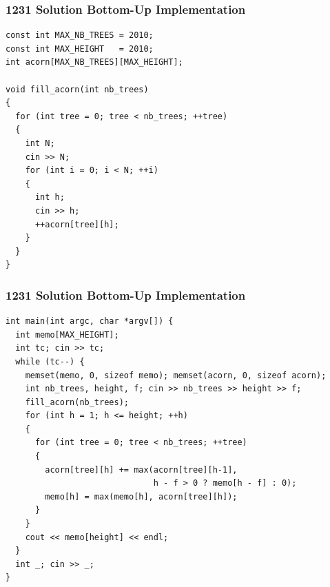 \documentclass{beamer}
\newcommand{\uvalink}[2]{UVa Online Judge (http://uva.onlinejudge.org)
  problem number \href{#2}{\textcolor{blue}{#1}.}}
\newcounter{exo}
\newcommand{\exo}{
  \addtocounter{exo}{1}
  Exercice \arabic{exo}
}
\begin{document}
\begin{frame}[fragile]
\frametitle{1231 Solution Bottom-Up Implementation}

\scriptsize
\begin{lstlisting}
const int MAX_NB_TREES = 2010;
const int MAX_HEIGHT   = 2010;
int acorn[MAX_NB_TREES][MAX_HEIGHT];

void fill_acorn(int nb_trees)
{
  for (int tree = 0; tree < nb_trees; ++tree)
  {
    int N;
    cin >> N;
    for (int i = 0; i < N; ++i)
    {
      int h;
      cin >> h;
      ++acorn[tree][h];
    }
  }
}
\end{lstlisting}

\end{frame}

\begin{frame}[fragile]
\frametitle{1231 Solution Bottom-Up Implementation}

\scriptsize
\begin{lstlisting}
int main(int argc, char *argv[]) {
  int memo[MAX_HEIGHT];
  int tc; cin >> tc;
  while (tc--) {
    memset(memo, 0, sizeof memo); memset(acorn, 0, sizeof acorn);
    int nb_trees, height, f; cin >> nb_trees >> height >> f;
    fill_acorn(nb_trees);
    for (int h = 1; h <= height; ++h)
    {
      for (int tree = 0; tree < nb_trees; ++tree)
      {
        acorn[tree][h] += max(acorn[tree][h-1],
                              h - f > 0 ? memo[h - f] : 0);
        memo[h] = max(memo[h], acorn[tree][h]);
      }
    }
    cout << memo[height] << endl;
  }
  int _; cin >> _;
}
\end{lstlisting}

\end{frame}

\fi


\end{document}
